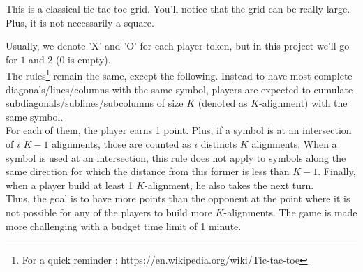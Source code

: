\documentclass[12pt,a4paper,BCOR12mm, headexclude, footexclude, twoside, openright]{scrartcl}
\numberwithin{equation}{section} %
\numberwithin{figure}{section} %
\numberwithin{table}{section} %
\begin{document}
\begin{center}
\end{center}

This is a classical tic tac toe grid. You'll notice that the grid can be really large. Plus, it is not necessarily a square.

Usually, we denote 'X' and 'O' for each player token, but in this project we'll go for $1$ and $2$ ($0$ is empty).\\

The rules\footnote{For a quick reminder : https://en.wikipedia.org/wiki/Tic-tac-toe} remain the same, except the following. Instead to have most complete diagonals/lines/columns with the same symbol, players are expected to cumulate subdiagonals/sublines/subcolumns of size $K$ (denoted as $K$-alignment) with the same symbol.\\
For each of them, the player earns 1 point. Plus, if a symbol is at an intersection of $i$ $K-1$ alignments, those are counted as $i$ distincts $K$ alignments. When a symbol is used at an intersection, this rule does not apply to symbols along the same direction for which the distance from this former is less than $K-1$. Finally, when a player build at least 1 $K$-alignment, he also takes the next turn.\\ 

Thus, the goal is to have more points than the opponent at the point where it is not possible for any of the players to build more $K$-alignments. The game is made more challenging with a budget time limit of 1 minute.\\
\end{document}
